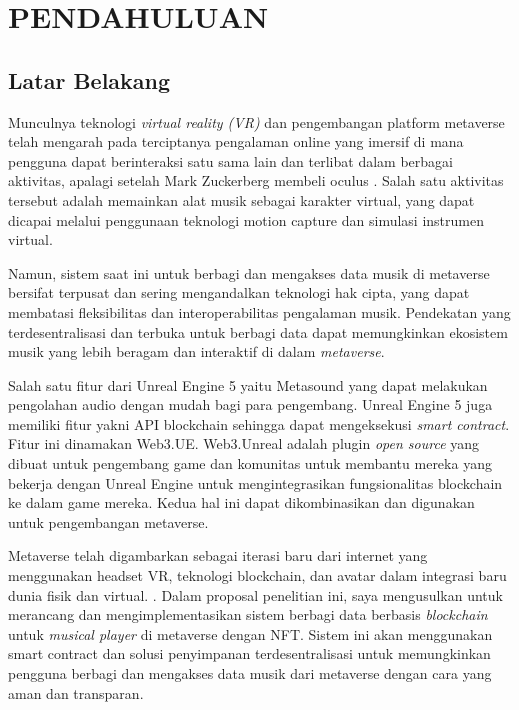 \chapter{PENDAHULUAN}

\section{Latar Belakang}

Munculnya teknologi \emph{virtual reality (VR)} dan pengembangan platform metaverse telah mengarah pada terciptanya
pengalaman online yang imersif di mana pengguna dapat berinteraksi satu sama lain dan terlibat dalam berbagai aktivitas, apalagi setelah  Mark Zuckerberg
membeli oculus \parencite{luckerson2014facebook}. 
Salah satu aktivitas tersebut adalah memainkan alat musik sebagai karakter virtual, yang dapat dicapai melalui penggunaan 
teknologi motion capture dan simulasi instrumen virtual.

Namun, sistem saat ini untuk berbagi dan mengakses data musik di metaverse bersifat terpusat dan sering mengandalkan teknologi 
hak cipta, yang dapat membatasi fleksibilitas dan interoperabilitas pengalaman musik. Pendekatan yang terdesentralisasi dan terbuka 
untuk berbagi data dapat memungkinkan ekosistem musik yang lebih beragam dan interaktif di dalam \emph{metaverse}.

Salah satu fitur dari Unreal Engine 5 yaitu Metasound yang dapat melakukan pengolahan audio dengan mudah bagi para pengembang. Unreal Engine 5 juga
memiliki fitur yakni API blockchain sehingga dapat mengeksekusi \emph{smart contract}. Fitur ini dinamakan Web3.UE. Web3.Unreal adalah plugin 
\emph{open source} yang dibuat untuk pengembang game dan komunitas untuk membantu mereka yang bekerja dengan Unreal Engine untuk mengintegrasikan 
fungsionalitas blockchain ke dalam game mereka. Kedua hal ini dapat dikombinasikan dan digunakan untuk
pengembangan metaverse.

Metaverse telah digambarkan sebagai iterasi baru dari internet yang menggunakan headset VR, teknologi blockchain, 
dan avatar dalam integrasi baru dunia fisik dan virtual. \parencite{DWIVEDI2022102542}. Dalam proposal penelitian ini, saya mengusulkan 
untuk merancang dan mengimplementasikan sistem berbagi data berbasis \emph{blockchain} 
untuk \emph{musical player} di metaverse dengan NFT. Sistem ini akan menggunakan smart contract dan solusi penyimpanan terdesentralisasi 
untuk memungkinkan pengguna berbagi dan mengakses data musik dari metaverse dengan cara yang aman dan transparan.

